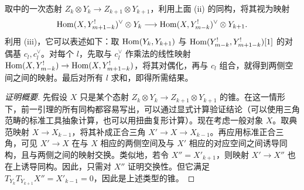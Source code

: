 \begin{lemma}\label{st:5.16}
取中的一次态射 $Z_k\otimes Y_k\to Z_{k+1}\otimes Y_{k+1}$，利用上面 \textup{(ii)} 的同构，将其视为映射
\begin{equation}\label{eq:5.26}
\operatorname{Hom}(X,Y^!_{m+1-k})^{\vee}\otimes Y_k\longrightarrow\operatorname{Hom}(X,Y^!_{m-k})^{\vee}\otimes Y_{k+1}.
\end{equation}
利用 \textup{(iii)}，它可以表述如下：取 $\operatorname{Hom}(Y_k,Y_{k+1})$ 与 $\operatorname{Hom}(Y^!_{m-k},Y^!_{m+1-k})[1]$ 的对偶基 $c_l,c_l^{\vee}$。对每个 $l$，先取与 $c_l^{\vee}$ 作乘法的线性映射 $\operatorname{Hom}(X,Y^!_{m-k})\to\operatorname{Hom}(X,Y^!_{m+1-k})$，将其对偶化，再与 $c_l$ 组合，就得到两侧空间之间的映射。最后对所有 $l$ 求和，即得所需结果。
\end{lemma}
\begin{proof}[证明概要]
先假设 $X$ 只是某个态射 $Z_k\otimes Y_k\to Z_{k+1}\otimes Y_{k+1}$ 的锥。在这一情形下，前一引理的所有同构都容易写出，可以通过显式计算验证结论（可以使用三角范畴的标准工具抽象计算，也可以用扭曲复形计算）。现在考虑一般对象 $X$。取典范映射 $X\to X_{k-1}$，将其补成正合三角 $X'\to X\to X_{k-1}$。再应用标准正合三角，可见 $X'\to X$ 在与 $X$ 相应的两侧空间及与 $X'$ 相应的对应空间之间诱导同构，且与两侧之间的映射交换。类似地，若令 $X''=X'_{k+1}$，则映射 $X'\to X''$ 也在上诱导同构。因此，只需对 $X''$ 证明交换性。但它满足 $T_{Y_k}T_{Y_{k+1}}X''=X'_{k-1}=0$，因此是上述类型的锥。
\end{proof}

